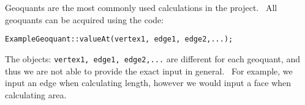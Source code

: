 \documentclass{amsart}
\theoremstyle{plain}
\numberwithin{equation}{section}
\begin{document}
Geoquants are the most commonly used calculations in the project. \ All
geoquants can be acquired using the code:\newline
\begin{verbatim}
ExampleGeoquant::valueAt(vertex1, edge1, edge2,...);
\end{verbatim}

\bigskip 

The objects: \texttt{vertex1, edge1, edge2,...} are different for each
geoquant, and thus we are not able to provide the exact input in general. \
For example, we input an edge when calculating length, however we would
input a face when calculating area. \ 
\end{document}
